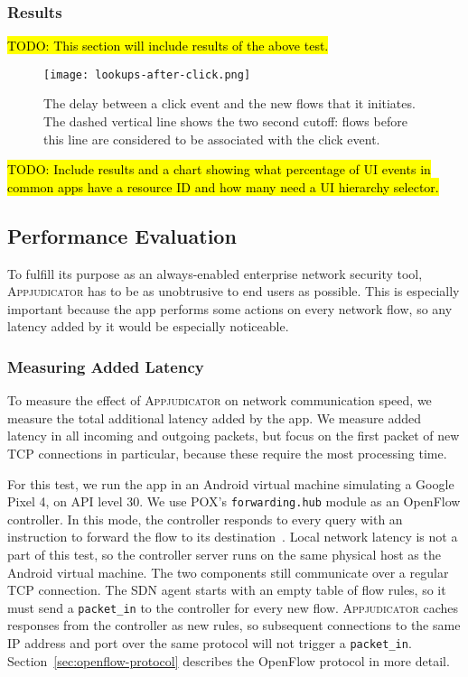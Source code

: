 \subsubsection{Results}
\label{sec:practical-results}

\hl{TODO: This section will include results of the above test.}

\begin{figure}[h]
    \centering
	\texttt{[image: lookups-after-click.png]}
	\caption{The delay between a click event and the new flows that it
		initiates. The dashed vertical line shows the two second cutoff: flows
		before this line are considered to be associated with the click event.}
	\label{fig:lookups-after-click}
\end{figure}

\hl{TODO: Include results and a chart showing what percentage of UI events in
	common apps have a resource ID and how many need a UI hierarchy selector.}

\subsection{Performance Evaluation}
\label{sec:performance-evaluation}

To fulfill its purpose as an always-enabled enterprise network security tool,
\textsc{Appjudicator} has to be as unobtrusive to end users as possible. This is
especially important because the app performs some actions on every network
flow, so any latency added by it would be especially noticeable.

\subsubsection{Measuring Added Latency}
\label{sec:measuring-added-latency}

To measure the effect of \textsc{Appjudicator} on network communication speed,
we measure the total additional latency added by the app. We measure added
latency in all incoming and outgoing packets, but focus on the first packet of
new TCP connections in particular, because these require the most processing
time.

For this test, we run the app in an Android virtual machine simulating a Google
Pixel 4, on API level 30. We use POX's \texttt{forwarding.hub} module as an
OpenFlow controller. In this mode, the controller responds to every query with
an instruction to forward the flow to its destination~\cite{mccauley2015}. Local
network latency is not a part of this test, so the controller server runs on the
same physical host as the Android virtual machine. The two components still
communicate over a regular TCP connection. The SDN agent starts with an empty
table of flow rules, so it must send a \texttt{packet\_in} to the controller for
every new flow. \textsc{Appjudicator} caches responses from the controller as
new rules, so subsequent connections to the same IP address and port over the
same protocol will not trigger a \texttt{packet\_in}.
Section~\ref{sec:openflow-protocol} describes the OpenFlow protocol in more
detail.


